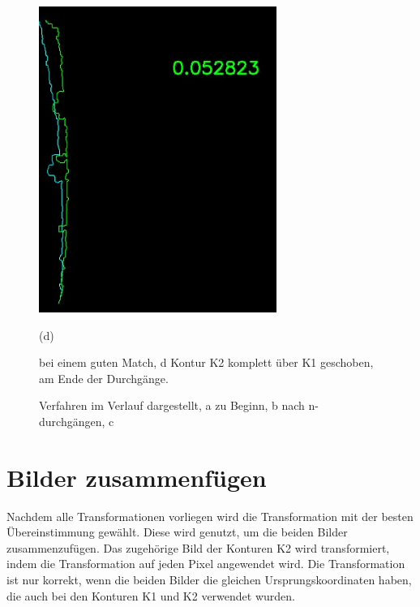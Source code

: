 \begin{figure}[h]
\begin{minipage}{0.24\textwidth}
        \includegraphics[width=\textwidth]{images/stitching_end.PNG} %
        \caption*{(d)}
    \end{minipage}\hfill
    \caption{Verfahren im Verlauf dargestellt, a zu Beginn, b nach n-durchgängen, c }
    bei einem guten Match, d Kontur K2 komplett über K1 geschoben, 
    am Ende der Durchgänge.
    \label{fig:stitching_all}
\end{figure}

\section{Bilder zusammenfügen}

Nachdem alle Transformationen vorliegen wird die Transformation mit der besten 
Übereinstimmung gewählt. Diese wird genutzt, um die beiden Bilder zusammenzufügen.
Das zugehörige Bild der Konturen K2 wird transformiert, indem die Transformation 
auf jeden Pixel angewendet wird.  
Die Transformation ist nur korrekt, wenn die beiden Bilder die gleichen 
Ursprungskoordinaten haben, die auch bei den Konturen K1 und K2 verwendet wurden.

